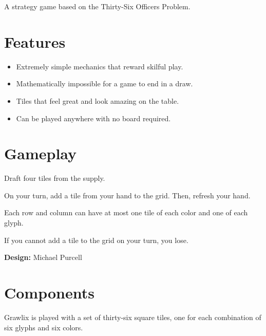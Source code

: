 \documentclass[a5paper, DIV=18, 12pt]{scrartcl}
\begin{document}
\vspace{-0.25ex}
\flushleft
\begin{center}{\setmainfont[Scale=1.15]{Quicksand}A strategy game based on the Thirty-Six Officers Problem.}\end{center}%

\vspace{0.5ex}

\begin{multicols}{2}
\section*{Features}
\begin{itemize}[leftmargin=*, nosep]
\item Extremely simple mechanics that reward skilful play.
\vspace{0.9ex}
\item Mathematically impossible for a game to end in a draw.
\vspace{0.9ex}
\item Tiles that feel great and look amazing on the table.
\vspace{0.9ex}
\item Can be played anywhere with no board required.
\end{itemize}

\section*{Gameplay}
Draft four tiles from the supply.

\vspace{1ex}

On your turn, add a tile from your hand to the grid. Then, refresh your hand.

\vspace{1ex}

Each row and column can have at most one tile of each color and one of each glyph.

\vspace{1ex}

If you cannot add a tile to the grid on your turn, you lose.

\vspace{4ex}

\textbf{Design:} Michael Purcell%

\section*{Components}
Grawlix is played with a set of thirty-six square tiles, one for each combination of six glyphs and six colors.


\end{multicols}
\end{document}
